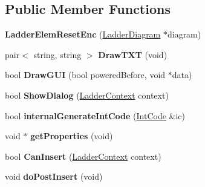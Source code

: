 \subsection*{Public Member Functions}
\begin{DoxyCompactItemize}
\item 
\hypertarget{class_ladder_elem_reset_enc_ab897cd09a5b7f9305c7ffea80297d90d}{{\bfseries Ladder\-Elem\-Reset\-Enc} (\hyperlink{class_ladder_diagram}{Ladder\-Diagram} $\ast$diagram)}\label{class_ladder_elem_reset_enc_ab897cd09a5b7f9305c7ffea80297d90d}

\item 
\hypertarget{class_ladder_elem_reset_enc_ac6ed1eb5730a80e06be9bd65545e6b01}{pair$<$ string, string $>$ {\bfseries Draw\-T\-X\-T} (void)}\label{class_ladder_elem_reset_enc_ac6ed1eb5730a80e06be9bd65545e6b01}

\item 
\hypertarget{class_ladder_elem_reset_enc_a34f720b20dd89328d702d9d35f421f41}{bool {\bfseries Draw\-G\-U\-I} (bool powered\-Before, void $\ast$data)}\label{class_ladder_elem_reset_enc_a34f720b20dd89328d702d9d35f421f41}

\item 
\hypertarget{class_ladder_elem_reset_enc_a5b03e3c8861f2f343a1ffd29d9d45a50}{bool {\bfseries Show\-Dialog} (\hyperlink{struct_ladder_context}{Ladder\-Context} context)}\label{class_ladder_elem_reset_enc_a5b03e3c8861f2f343a1ffd29d9d45a50}

\item 
\hypertarget{class_ladder_elem_reset_enc_a8bfd1caac166cd5e310d1430b58ea2f5}{bool {\bfseries internal\-Generate\-Int\-Code} (\hyperlink{class_int_code}{Int\-Code} \&ic)}\label{class_ladder_elem_reset_enc_a8bfd1caac166cd5e310d1430b58ea2f5}

\item 
\hypertarget{class_ladder_elem_reset_enc_a9f2362920a6e9cf0d1c8e0f1beaf558b}{void $\ast$ {\bfseries get\-Properties} (void)}\label{class_ladder_elem_reset_enc_a9f2362920a6e9cf0d1c8e0f1beaf558b}

\item 
\hypertarget{class_ladder_elem_reset_enc_a7fe1b26ce9e31b5a2f8274b7516fcf8f}{bool {\bfseries Can\-Insert} (\hyperlink{struct_ladder_context}{Ladder\-Context} context)}\label{class_ladder_elem_reset_enc_a7fe1b26ce9e31b5a2f8274b7516fcf8f}

\item 
\hypertarget{class_ladder_elem_reset_enc_a5de7a1d6dc9721a7f282ffdcce9240fd}{void {\bfseries do\-Post\-Insert} (void)}\label{class_ladder_elem_reset_enc_a5de7a1d6dc9721a7f282ffdcce9240fd}


\end{DoxyCompactItemize}
